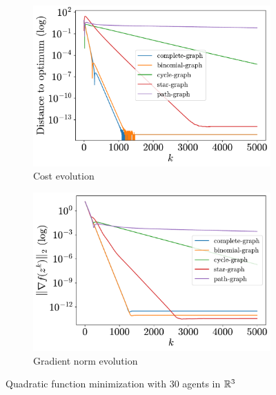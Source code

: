 \documentclass[a4paper,11pt,oneside]{book}
\begin{document}
\begin{figure}[H]
      \centering
      \begin{subfigure}[t]{0.46\linewidth}
            \centering
            \includegraphics[width=\linewidth]{./figs/quadratic/30_3/distance.pdf} 
            \caption{Cost evolution}
      \end{subfigure}
      \hfill
      \begin{subfigure}[t]{0.46\linewidth}
            \centering
            \includegraphics[width=\linewidth]{./figs/quadratic/30_3/gradient.pdf} 
            \caption{Gradient norm evolution}
      \end{subfigure}
      \caption{Quadratic function minimization with $30$ agents in ${\mathbb{R}}^{3}$}
      \label{fig:quadratic_30_3}
\end{figure}
\end{document}
